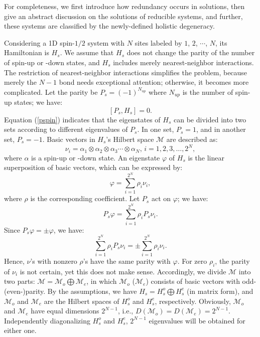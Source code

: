 \documentclass[twocolumn,floats,superscriptaddress]{revtex4}
\begin{document}
For completeness, we first introduce how redundancy occurs in solutions, then give {an} abstract discussion on the solutions of reducible systems, and further, these systems are classified by the newly-defined holistic degeneracy.

Considering a 1D spin-$1/2$ system with $N$ sites labeled by $1$, $2$, $\cdots$, $N$, its Hamiltonian is $H_{s}$. We assume that $H_{s}$ does not change the parity of the number of spin-up {or -down states}, and $H_s$ includes merely nearest-neighbor interactions. {The restriction of nearest-neighbor interactions simplifies the problem, because merely the $N-1$ bond needs exceptional attention; otherwise, it becomes more complicated.} Let the parity be $P_{s}=(-1)^{N_{up}}$ where $N_{up}$ is the number of spin-up states; we have:
\begin{equation}\label{pspin}
 [P_{s}, H_{s}]=0.
\end{equation}
Equation (\ref{pspin}) indicates that the eigenstates of $H_{s}$ can be divided into two sets according to different eigenvalues of $P_s$. In one set, $P_{s}=1$, and in another set, $P_{s}=-1$. Basic vectors in $H_{s}$'s Hilbert space $\mathcal{M}$ are described as:
\begin{equation}\label{basicv}
 \nu_{i}=\alpha_1\otimes\alpha_2\otimes\alpha_3 \cdots \otimes\alpha_{N},\, i={1,2,3,\ldots,2^N},
\end{equation}
where $\alpha$ is a spin-up or -down state. An eigenstate $\varphi$ of $H_{s}$ is {the} linear superposition of basic vectors, which can be expressed by:
\begin{equation}\label{eigenstate}
 \varphi=\sum_{i=1}^{2^N}\rho_i\nu_i,
\end{equation}
where $\rho$ is the corresponding coefficient. Let $P_{s}$ act on $\varphi$; we have:
\begin{equation}\label{pvariphi1}
 P_{s}\varphi=\sum_{i=1}^{2^N}\rho_i P_{s}\nu_i.
\end{equation}
Since $P_{s}\varphi=\pm\varphi$, we have:
\begin{equation}\label{pvariphi2}
\sum_{i=1}^{2^N}\rho_i P_{s}\nu_i=\pm\sum_{i=1}^{2^N}\rho_i\nu_i.
\end{equation}
Hence, $\nu$'s with nonzero $\rho$'s have the same parity with $\varphi$. For zero $\rho_i$, the parity of $\nu_i$ is not certain, yet this does not make sense. Accordingly, we divide $\mathcal{M}$ into two parts: $\mathcal{M}=\mathcal{M}_{ o}\bigoplus\mathcal{M}_{e}$, in which $\mathcal{M}_{o}$ {($\mathcal{M}_{e}$) consists of basic vectors with odd-(even-)parity}. By the assumptions, we have $H_s=H_s^{o}\bigoplus H_s^{e}$ ({in matrix form}), and $\mathcal{M}_{o}$ and $\mathcal{M}_{e}$ are the Hilbert spaces of $H_s^{o}$ and $H_s^{e}$, respectively. Obviously, $\mathcal{M}_{o}$ and $\mathcal{M}_{e}$ have equal dimensions $2^{N-1}$, i.e., $D(\mathcal{M}_{o})=D(\mathcal{M}_{e})=2^{N-1}$. Independently diagonalizing $H_s^{o}$ and $H_s^{e}$, $2^{N-1}$ eigenvalues will be obtained for either one.
\end{document}
